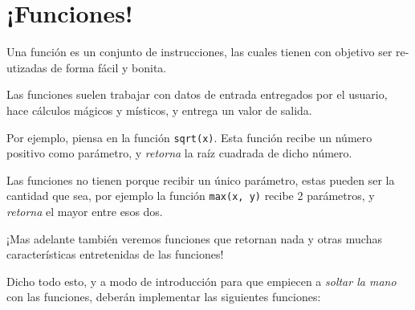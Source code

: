 \section{¡Funciones!}

Una función es un conjunto de instrucciones, las cuales tienen con objetivo ser re-utizadas de forma fácil y bonita.

Las funciones suelen trabajar con datos de entrada entregados por el usuario, hace cálculos mágicos y místicos, y entrega un valor de salida.

Por ejemplo, piensa en la función \texttt{sqrt(x)}. Esta función recibe un número positivo como parámetro, y \textit{retorna} la raíz cuadrada de dicho número.

Las funciones no tienen porque recibir un único parámetro, estas pueden ser la cantidad que sea, por ejemplo  la función \texttt{max(x, y)} recibe 2 parámetros, y \textit{retorna} el mayor entre esos dos.

¡Mas adelante también veremos funciones que retornan nada y otras muchas características entretenidas de las funciones!

Dicho todo esto, y a modo de introducción para que empiecen a \textit{soltar la mano} con las funciones, deberán implementar las siguientes funciones:

